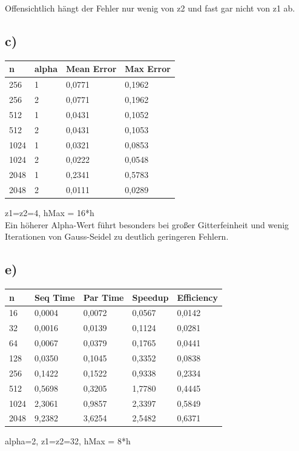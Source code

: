 \documentclass[paper = a4]{scrartcl}
\begin{document}
Offensichtlich hängt der Fehler nur wenig von z2 und fast gar nicht von z1 ab.

\subsection*{c)}
\begin{tabular}{l|l|l|l}
\hline
n    & alpha & Mean Error & Max Error \\
\hline
256  & 1     & 0,0771     & 0,1962 \\
256  & 2     & 0,0771     & 0,1962 \\
512  & 1     & 0,0431     & 0,1052 \\
512  & 2     & 0,0431     & 0,1053 \\
1024 & 1     & 0,0321     & 0,0853 \\
1024 & 2     & 0,0222     & 0,0548 \\
2048 & 1     & 0,2341     & 0,5783 \\
2048 & 2     & 0,0111     & 0,0289 \\
\hline
\end{tabular}
z1=z2=4, hMax = 16*h\\

Ein höherer Alpha-Wert führt besonders bei großer Gitterfeinheit und wenig Iterationen von Gauss-Seidel zu deutlich geringeren Fehlern.

\subsection*{e)}
\begin{tabular}{l|l|l|l|l}
\hline
n    & Seq Time & Par Time & Speedup & Efficiency \\
\hline
16   & 0,0004   & 0,0072   & 0,0567  & 0,0142 \\
32   & 0,0016   & 0,0139   & 0,1124  & 0,0281 \\
64   & 0,0067   & 0,0379   & 0,1765  & 0,0441 \\
128  & 0,0350   & 0,1045   & 0,3352  & 0,0838 \\
256  & 0,1422   & 0,1522   & 0,9338  & 0,2334 \\
512  & 0,5698   & 0,3205   & 1,7780  & 0,4445 \\
1024 & 2,3061   & 0,9857   & 2,3397  & 0,5849 \\
2048 & 9,2382   & 3,6254   & 2,5482  & 0,6371 \\
\hline
\end{tabular}
alpha=2, z1=z2=32, hMax = 8*h
\end{document}
